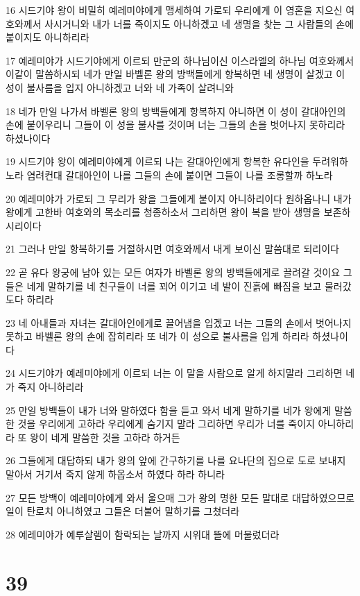 \par 16 시드기야 왕이 비밀히 예레미야에게 맹세하여 가로되 우리에게 이 영혼을 지으신 여호와께서 사시거니와 내가 너를 죽이지도 아니하겠고 네 생명을 찾는 그 사람들의 손에 붙이지도 아니하리라
\par 17 예레미야가 시드기야에게 이르되 만군의 하나님이신 이스라엘의 하나님 여호와께서 이같이 말씀하시되 네가 만일 바벨론 왕의 방백들에게 항복하면 네 생명이 살겠고 이 성이 불사름을 입지 아니하겠고 너와 네 가족이 살려니와
\par 18 네가 만일 나가서 바벨론 왕의 방백들에게 항복하지 아니하면 이 성이 갈대아인의 손에 붙이우리니 그들이 이 성을 불사를 것이며 너는 그들의 손을 벗어나지 못하리라 하셨나이다
\par 19 시드기야 왕이 예레미야에게 이르되 나는 갈대아인에게 항복한 유다인을 두려워하노라 염려컨대 갈대아인이 나를 그들의 손에 붙이면 그들이 나를 조롱할까 하노라
\par 20 예레미야가 가로되 그 무리가 왕을 그들에게 붙이지 아니하리이다 원하옵나니 내가 왕에게 고한바 여호와의 목소리를 청종하소서 그리하면 왕이 복을 받아 생명을 보존하시리이다
\par 21 그러나 만일 항복하기를 거절하시면 여호와께서 내게 보이신 말씀대로 되리이다
\par 22 곧 유다 왕궁에 남아 있는 모든 여자가 바벨론 왕의 방백들에게로 끌려갈 것이요 그들은 네게 말하기를 네 친구들이 너를 꾀어 이기고 네 발이 진흙에 빠짐을 보고 물러갔도다 하리라
\par 23 네 아내들과 자녀는 갈대아인에게로 끌어냄을 입겠고 너는 그들의 손에서 벗어나지 못하고 바벨론 왕의 손에 잡히리라 또 네가 이 성으로 불사름을 입게 하리라 하셨나이다
\par 24 시드기야가 예레미야에게 이르되 너는 이 말을 사람으로 알게 하지말라 그리하면 네가 죽지 아니하리라
\par 25 만일 방백들이 내가 너와 말하였다 함을 듣고 와서 네게 말하기를 네가 왕에게 말씀한 것을 우리에게 고하라 우리에게 숨기지 말라 그리하면 우리가 너를 죽이지 아니하리라 또 왕이 네게 말씀한 것을 고하라 하거든
\par 26 그들에게 대답하되 내가 왕의 앞에 간구하기를 나를 요나단의 집으로 도로 보내지 말아서 거기서 죽지 않게 하옵소서 하였다 하라 하니라
\par 27 모든 방백이 예레미야에게 와서 울으매 그가 왕의 명한 모든 말대로 대답하였으므로 일이 탄로치 아니하였고 그들은 더불어 말하기를 그쳤더라
\par 28 예레미야가 예루살렘이 함락되는 날까지 시위대 뜰에 머물렀더라

\chapter{39}

